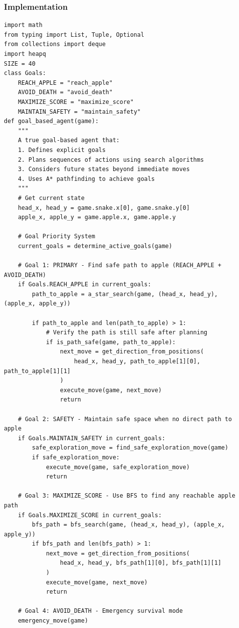 \documentclass[11pt,a4paper]{article}
\begin{document}
\subsubsection{Implementation}
\begin{lstlisting}[caption=Goal-Based Agent]
import math
from typing import List, Tuple, Optional
from collections import deque
import heapq
SIZE = 40
class Goals:
    REACH_APPLE = "reach_apple"
    AVOID_DEATH = "avoid_death"
    MAXIMIZE_SCORE = "maximize_score"
    MAINTAIN_SAFETY = "maintain_safety"
def goal_based_agent(game):
    """
    A true goal-based agent that:
    1. Defines explicit goals
    2. Plans sequences of actions using search algorithms
    3. Considers future states beyond immediate moves
    4. Uses A* pathfinding to achieve goals
    """
    # Get current state
    head_x, head_y = game.snake.x[0], game.snake.y[0]
    apple_x, apple_y = game.apple.x, game.apple.y

    # Goal Priority System
    current_goals = determine_active_goals(game)

    # Goal 1: PRIMARY - Find safe path to apple (REACH_APPLE + AVOID_DEATH)
    if Goals.REACH_APPLE in current_goals:
        path_to_apple = a_star_search(game, (head_x, head_y), (apple_x, apple_y))

        if path_to_apple and len(path_to_apple) > 1:
            # Verify the path is still safe after planning
            if is_path_safe(game, path_to_apple):
                next_move = get_direction_from_positions(
                    head_x, head_y, path_to_apple[1][0], path_to_apple[1][1]
                )
                execute_move(game, next_move)
                return

    # Goal 2: SAFETY - Maintain safe space when no direct path to apple
    if Goals.MAINTAIN_SAFETY in current_goals:
        safe_exploration_move = find_safe_exploration_move(game)
        if safe_exploration_move:
            execute_move(game, safe_exploration_move)
            return

    # Goal 3: MAXIMIZE_SCORE - Use BFS to find any reachable apple path
    if Goals.MAXIMIZE_SCORE in current_goals:
        bfs_path = bfs_search(game, (head_x, head_y), (apple_x, apple_y))
        if bfs_path and len(bfs_path) > 1:
            next_move = get_direction_from_positions(
                head_x, head_y, bfs_path[1][0], bfs_path[1][1]
            )
            execute_move(game, next_move)
            return

    # Goal 4: AVOID_DEATH - Emergency survival mode
    emergency_move(game)
\end{lstlisting}
\end{document}
